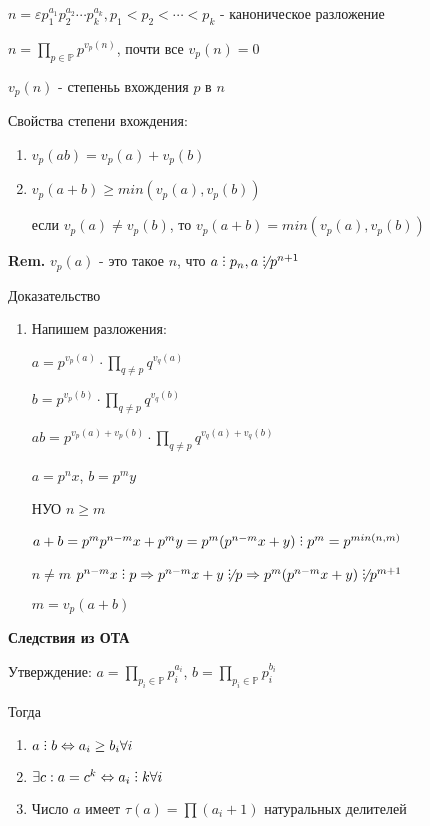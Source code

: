 \documentclass[14pt, letter paper]{article}
\DeclareRobustCommand{\divby}{%
  \mathrel{\text{\vbox{\baselineskip.65ex\lineskiplimit0pt\hbox{.}\hbox{.}\hbox{.}}}}%
}
\begin{document}
$n = \varepsilon p_1^{a_1} p_2^{a_2} \cdots p_k^{a_k}, p_1 < p_2 < \cdots < p_k$ - каноническое разложение

$n = \prod\limits_{p \in \mathds{P}} p^{v_p(n)}$, почти все $v_p(n) = 0$

$v_p(n)$ - степеньь вхождения $p$ в $n$

Свойства степени вхождения:

\begin{enumerate}
    \item $v_p(ab) = v_p(a) + v_p(b)$
    \item $v_p(a + b) \geq min(v_p(a), v_p(b))$

    если $v_p(a) \neq v_p(b)$, то $v_p(a+b) = min(v_p(a), v_p(b))$
\end{enumerate}

\textbf{Rem.} $v_p(a)$ - это такое $n$, что $a \divby p_n, a \not\divby p^{n+1}$

\begin{center}
    Доказательство
\end{center}

\begin{enumerate}
    \item Напишем разложения:

    $a = p^{v_p(a)} \cdot \prod\limits_{q \neq p} q^{v_q(a)}$

    $b = p^{v_p(b)} \cdot \prod\limits_{q \neq p} q^{v_q(b)}$

    $ab = p^{v_p(a) + v_p(b)} \cdot \prod\limits_{q \neq p} q^{v_q(a) + v_q(b)}$

    $a = p^n x$, $b = p^m y$

    НУО $n \geq m$

    $a + b = p^m p^{n-m} x + p^m y = p^m (p^{n-m} x + y) \divby p^m = p^{min(n, m)}$

    $n \neq m$ $p^{n-m} x \divby p \Rightarrow p^{n-m} x + y \not\divby p \Rightarrow p^m(p^{n-m} x + y) \not\divby p^{m+1}$

    $m = v_p(a+b)$
\end{enumerate}

\textbf{Следствия из ОТА}

Утверждение: $a = \prod\limits_{p_i \in \mathds{P}} p_i^{a_i}$, $b = \prod\limits_{p_i \in \mathds{P}} p_i^{b_i}$

Тогда 

\begin{enumerate}
    \item $a \divby b \Leftrightarrow a_i \geq b_i \forall i$
    \item $\exists c : a = c^k \Leftrightarrow a_i \divby k \forall i$
    \item Число $a$ имеет $\tau (a) = \prod (a_i + 1)$ натуральных делителей
\end{enumerate}
\end{document}
